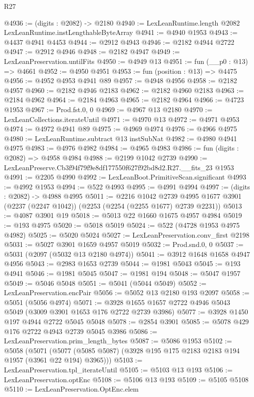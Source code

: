 \begin{lexlean}{R27}
\begin{coremodule}
@4936 := (digits : @2082) -> @2180
@4940 := LexLeanRuntime.length @2082 LexLeanRuntime.instLengthableByteArray
@4941 := @4940 @1953
@4943 := @4437 @4941 @4453
@4944 := @2912 @4943
@4946 := @2182 @4944 @2722
@4947 := @2912 @4946
@4948 := @2182 @4947
@4949 := LexLeanPreservation.untilFits
@4950 := @4949 @13
@4951 := fun (__p0 : @13) => @4661
@4952 := @4950 @4951
@4953 := fun (position : @13) => @4475
@4956 := @4952 @4953 @4941 @89
@4957 := @4948 @4956
@4958 := @2182 @4957
@4960 := @2182 @4946 @2183
@4962 := @2182 @4960 @2183
@4963 := @2184 @4962
@4964 := @2184 @4963
@4965 := @2182 @4964
@4966 := @4723 @1953
@4967 := Prod.fst.{0, 0}
@4969 := @4967 @13 @2180
@4970 := LexLeanCollections.iterateUntil
@4971 := @4970 @13
@4972 := @4971 @4953
@4974 := @4972 @4941 @89
@4975 := @4969 @4974
@4976 := @4966 @4975
@4980 := LexLeanRuntime.subtract @13 instSubNat
@4982 := @4980 @4941 @4975
@4983 := @4976 @4982
@4984 := @4965 @4983
@4986 := fun (digits : @2082) => @4958 @4984
@4988 := @2199 @1042 @2739
@4990 := LexLeanPreserve.Cb3f94f79f9e8df177550f627f92bd8d2.R27.__fits_23 @1953
@4991 := @2205 @4990
@4992 := LexLeanBoot.PrimitiveScan.significant
@4993 := @4992 @1953
@4994 := @522 @4993
@4995 := @4991 @4994
@4997 := (digits : @2082) -> @4988 @4995
@5011 := @2216
    @1042
    @2739
    @4995
    @1677
    @3901
    (@2237 (@2247 @1042))
    (@2253 (@2254 (@2255 @1677) @2739 @2231))
@5013 := @4087 @3901 @19
@5018 := @5013 @22 @1660 @1675 @4957 @4984
@5019 := @193 @4975
@5020 := @5018 @5019
@5024 := @522 (@4728 @1953 @4975 @4982)
@5025 := @5020 @5024
@5027 := LexLeanPreservation.conv_first @2198
@5031 := @5027 @3901 @1659 @4957 @5019
@5032 := Prod.snd.{0, 0}
@5037 := @5031 (@2097 (@5032 @13 @2180 @4974))
@5041 := @3912 @1648 @1658 @4947 @4956
@5043 := @2983 @1653 @2739
@5044 := @1981 @5043
@5045 := @193 @4941
@5046 := @1981 @5045
@5047 := @1981 @194
@5048 := @5047 @1957
@5049 := @5046 @5048
@5051 := @5041 (@5044 @5049)
@5052 := LexLeanPreservation.encPair
@5056 := @5052 @13 @2180 @193 @2097
@5058 := @5051 (@5056 @4974)
@5071 := @3928 @1655 @1657 @2722 @4946 @5043 @5049 (@3009 @3901 @1653 @176 @2722 @2739 @3986)
@5077 := @3928 @1450 @197 @4944 @2722 @5045 @5048
@5078 := @2854 @3901
@5085 := @5078 @429 @176 @2722 @4943 @2739 @5045 @3986
@5086 := LexLeanPreservation.prim_length_bytes
@5087 := @5086 @1953
@5102 := @5058
    (@5071 (@5077 (@5085 @5087) (@3928 @195 @175 @2183 @2183 @194 @1957 (@3961 @22 @194) @3965)))
@5103 := LexLeanPreservation.tpl_iterateUntil
@5105 := @5103 @13 @193
@5106 := LexLeanPreservation.optEnc
@5108 := @5106 @13 @193
@5109 := @5105 @5108
@5110 := LexLeanPreservation.OptEnc.elem

\end{coremodule}
\end{lexlean}
